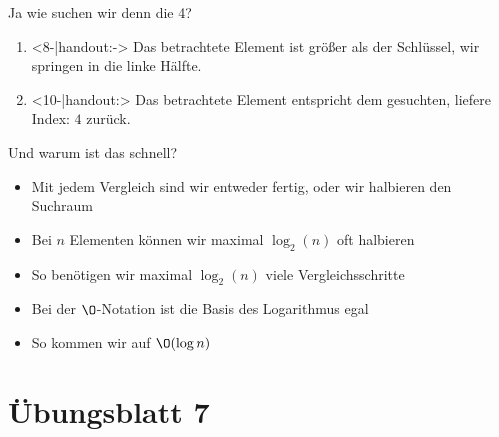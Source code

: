 {\begin{frame}[c]{Ja wie suchen wir denn die 4?}
\begin{enumerate}
    \item<8-|handout:\HandoutB-> Das betrachtete Element ist größer als der Schlüssel, wir springen in die linke Hälfte. 
    \item<10-|handout:\HandoutC> Das betrachtete Element entspricht dem gesuchten, liefere Index: \(4\) zurück.
\end{enumerate}
\end{frame}
}

\begin{frame}{Und warum ist das schnell?}
    \begin{itemize}[<+(1)->]
        \itemsep10pt
        \item Mit jedem Vergleich sind wir entweder fertig, oder wir halbieren den Suchraum
        \item Bei \(n\) Elementen können wir maximal \(\log_2(n)\) oft halbieren 
        \item So benötigen wir maximal \(\log_2(n)\) viele Vergleichsschritte
        \item Bei der \(\O\)-Notation ist die Basis des Logarithmus egal
        \item So kommen wir auf \(\O(\log n)\)
    \end{itemize}
\end{frame}

\section{Übungsblatt 7}
